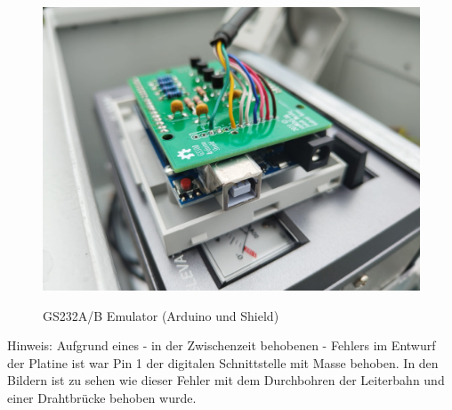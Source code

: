 \begin{figure}[H]
	\centering
	\includegraphics[width=15cm]{../ref/PCB_Seite_GS232.jpeg}
	\label{fig:Schaltung_Ausgangstreiber_Arduino-Shield}
	\caption{GS232A/B Emulator (Arduino und Shield)}
\end{figure}

Hinweis: Aufgrund eines - in der Zwischenzeit behobenen - Fehlers im Entwurf der Platine ist war Pin 1 der digitalen Schnittstelle mit Masse behoben. In den Bildern ist zu sehen wie dieser Fehler mit dem Durchbohren der Leiterbahn und einer Drahtbrücke behoben wurde.